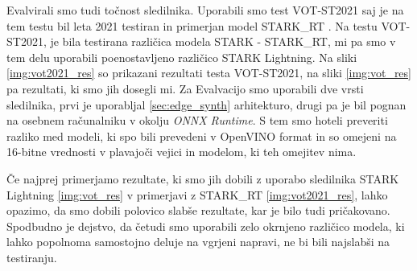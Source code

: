 \documentclass[a4paper,12pt,openright]{book}
\begin{document}
Evalvirali smo tudi točnost sledilnika. Uporabili smo test VOT-ST2021 \cite{vot2021} saj je na tem testu bil leta 2021 testiran in primerjan model STARK\_RT \cite{stark}. Na testu VOT-ST2021, je bila testirana različica modela STARK - STARK\_RT, mi pa smo v tem delu uporabili poenostavljeno različico STARK Lightning. Na sliki \ref{img:vot2021_res} so prikazani rezultati testa VOT-ST2021, na sliki \ref{img:vot_res} pa rezultati, ki smo jih dosegli mi. Za Evalvacijo smo uporabili dve vrsti sledilnika, prvi je uporabljal \ref{sec:edge_synth} arhitekturo, drugi pa je bil pognan na osebnem računalniku v okolju \emph{ONNX Runtime}. S tem smo hoteli preveriti razliko med modeli, ki spo bili prevedeni v OpenVINO format in so omejeni na 16-bitne vrednosti v plavajoči vejici in modelom, ki teh omejitev nima.

Če najprej primerjamo rezultate, ki smo jih dobili z uporabo sledilnika STARK Lightning \ref{img:vot_res} v primerjavi z STARK\_RT \ref{img:vot2021_res}, lahko opazimo, da smo dobili polovico slabše rezultate, kar je bilo tudi pričakovano. Spodbudno je dejstvo, da četudi smo uporabili zelo okrnjeno različico modela, ki lahko popolnoma samostojno deluje na vgrjeni napravi, ne bi bili najslabši na testiranju.
\end{document}
